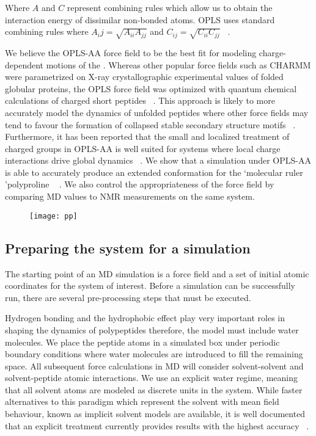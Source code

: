 Where $A$ and $C$ represent combining rules which allow us to obtain the interaction energy of dissimilar non-bonded atoms. OPLS uses standard combining rules where $A_ij = \sqrt{A_{ii}A_{jj}}$ and $C_{ij} = \sqrt{C_{ii}C_{jj}}$ ~\cite{good1970new}.

We believe the OPLS-AA force field to be the best fit for modeling charge-dependent motions of the \gct. Whereas other popular force fields such as CHARMM were parametrized on X-ray crystallographic experimental values of folded globular proteins, the OPLS force field was optimized with quantum chemical calculations of charged short peptides ~\cite{kukol2008molecular}. This approach is likely to more accurately model the dynamics of unfolded peptides where other force fields may tend to favour the formation of collapsed stable secondary structure motifs ~\cite{henriques2015molecular, tran2008role}. Furthermore, it has been reported that the small and localized treatment of charged groups in OPLS-AA is well suited for systems where local charge interactions drive global dynamics ~\cite{vitalis2009absinth}. We show that a simulation under OPLS-AA is able to accurately produce an extended conformation for the \lq molecular ruler \rq polyproline ~\cite{schuler2005polyproline} . We also control the appropriateness of the force field by comparing MD values to NMR measurements on the same system.

\begin{figure}
\centering
\texttt{[image: pp]}
\label{fig:pp}
\end{figure}


\subsection{Preparing the system for a simulation}

The starting point of an MD simulation is a force field and a set of initial atomic coordinates for the system of interest. Before a simulation can be successfully run, there are several pre-processing steps that must be executed. 

Hydrogen bonding and the hydrophobic effect play very important roles in shaping the dynamics of polypeptides therefore, the model must include water molecules. We place the peptide atoms in a simulated box under periodic boundary conditions where water molecules are introduced to fill the remaining space. All subsequent force calculations in MD will consider solvent-solvent and solvent-peptide atomic interactions. We use an explicit water regime, meaning that all solvent atoms are modeled as discrete units in the system. While faster alternatives to this paradigm which represent the solvent with mean field behaviour, known as implicit solvent models are available, it is well documented that an explicit treatment currently provides results with the highest accuracy ~\cite{onufriev2008implicit, arnold1994evaluation, zhou2003free}. 

